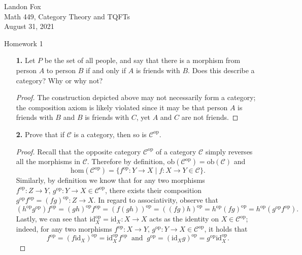 \documentclass[ 12pt ]{article}
\begin{document}
\noindent Landon Fox \\
\noindent Math 449, Category Theory and TQFTs \\
\noindent August 31, 2021

\begin{center}
\Large Homework 1
\end{center}

\begin{enumerate}
	\item[\textbf{1.}] Let $P$ be the set of all people, and say that there is a morphism from person $A$ to person $B$ if and only if $A$ is friends with $B$. Does this describe a category? Why or why not?

		\begin{proof}
			The construction depicted above may not necessarily form a category; the composition axiom is likely violated since it may be that person $A$ is friends with $B$ and $B$ is friends with $C$, yet $A$ and $C$ are not friends.
		\end{proof}


	\item[\textbf{2.}] Prove that if $\mathscr{C}$ is a category, then so is $\mathscr{C}^\mathrm{op}$.

		\begin{proof}
			Recall that the opposite category $\mathscr{C}^\mathrm{op}$ of a category $\mathscr{C}$ simply reverses all the morphisms in $\mathscr{C}$. Therefore by definition, $\mathrm{ob}(\mathscr{C}^\mathrm{op}) = \mathrm{ob}(\mathscr{C})$ and $$\mathrm{hom}(\mathscr{C}^\mathrm{op}) = \{ f^\mathrm{op} : Y \to X \mid f : X \to Y \in \mathscr{C} \}.$$ Similarly, by definition we know that for any two morphisms $f^\mathrm{op} : Z \to Y,\, g^\mathrm{op} : Y \to X \in \mathscr{C}^\mathrm{op}$, there exists their composition $g^\mathrm{op} f^\mathrm{op} = (fg)^\mathrm{op} : Z \to X$. In regard to associativity, observe that $$(h^\mathrm{op} g^\mathrm{op}) f^\mathrm{op} = (gh)^\mathrm{op} f^\mathrm{op} = (f(gh))^\mathrm{op} = ((fg)h)^\mathrm{op} = h^\mathrm{op} (fg)^\mathrm{op} = h^\mathrm{op} (g^\mathrm{op} f^\mathrm{op}).$$ Lastly, we can see that $\mathrm{id}_X^\mathrm{op} = \mathrm{id}_X : X \to X$ acts as the identity on $X \in \mathscr{C}^\mathrm{op}$; indeed, for any two morphisms $f^\mathrm{op} : X \to Y,\, g^\mathrm{op} : Y \to X \in \mathscr{C}^\mathrm{op}$, it holds that $$f^\mathrm{op} = (f \mathrm{id}_X)^\mathrm{op} = \mathrm{id}_X^\mathrm{op}f^\mathrm{op}\;\; \mathrm{and}\;\; g^\mathrm{op} = (\mathrm{id}_X g)^\mathrm{op} = g^\mathrm{op} \mathrm{id}_X^\mathrm{op}.$$
		\end{proof}



\end{enumerate}
\end{document}
